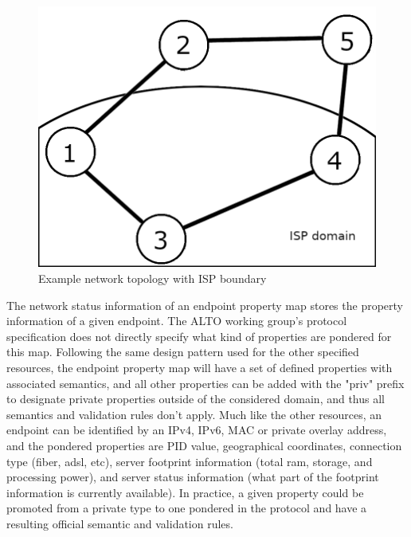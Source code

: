 \begin{figure}[!h]
        \centering
        \includegraphics[scale=0.75]{img/topology.png}
        \caption{Example network topology with ISP boundary}
        \label{fig:example-topology-boundary}
\end{figure}

    The network status information of an endpoint property map stores the property information of a given endpoint.
    The ALTO working group's protocol specification \cite{alto-protocol} does not directly specify what kind of properties are pondered for this map.
    Following the same design pattern used for the other specified resources, the endpoint property map will have a set of defined properties with associated semantics, and all other properties can be added with the "priv" prefix to designate private properties outside of the considered domain, and thus all semantics and validation rules don't apply.
    Much like the other resources, an endpoint can be identified by an IPv4, IPv6, MAC or private overlay address, and the pondered properties are PID value, geographical coordinates, connection type (fiber, adsl, etc), server footprint information (total ram, storage, and processing power), and server status information (what part of the footprint information is currently available).
    In practice, a given property could be promoted from a private type to one pondered in the protocol and have a resulting official semantic and validation rules.

